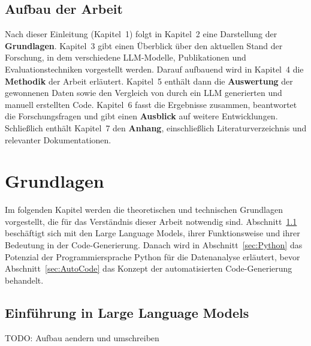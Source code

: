 \documentclass[11pt,a4paper]{article}
\begin{document}
\subsection{Aufbau der Arbeit}
Nach dieser Einleitung (Kapitel~1) folgt in Kapitel~2 eine Darstellung der \textbf{Grundlagen}. Kapitel~3 gibt einen Überblick über den aktuellen Stand der Forschung, in dem verschiedene LLM-Modelle, Publikationen und Evaluationstechniken vorgestellt werden. Darauf aufbauend wird in Kapitel~4 die \textbf{Methodik} der Arbeit erläutert. Kapitel~5 enthält dann die \textbf{Auswertung} der gewonnenen Daten sowie den Vergleich von durch ein LLM generierten und manuell erstellten Code. Kapitel~6 fasst die Ergebnisse zusammen, beantwortet die Forschungsfragen und gibt einen \textbf{Ausblick} auf weitere Entwicklungen. Schließlich enthält Kapitel~7 den \textbf{Anhang}, einschließlich Literaturverzeichnis und relevanter Dokumentationen.


\section{Grundlagen}

Im folgenden Kapitel werden die theoretischen und technischen Grundlagen vorgestellt, die für das Verständnis dieser Arbeit notwendig sind. Abschnitt~\ref{sec:LLMs} beschäftigt sich mit den Large Language Models, ihrer Funktionsweise und ihrer Bedeutung in der Code-Generierung. Danach wird in Abschnitt~\ref{sec:Python} das Potenzial der Programmiersprache Python für die Datenanalyse erläutert, bevor Abschnitt~\ref{sec:AutoCode} das Konzept der automatisierten Code-Generierung behandelt.

\subsection{Einführung in Large Language Models}
\label{sec:LLMs}
TODO: Aufbau aendern und umschreiben
\end{document}
